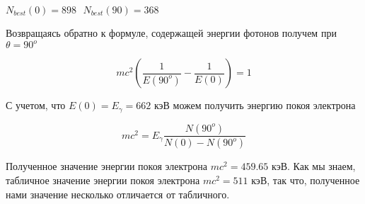     \begin{center}
        $N_{best}(0) = 898 ~~~ N_{best}(90) =368$
    \end{center}

    Возвращаясь обратно к формуле, содержащей энергии фотонов получем при $\theta = 90^o$

    \begin{equation}
        mc^2 \left (\frac{1}{E(90^o)} - \frac{1}{E(0)} \right) = 1
    \end{equation}

    С учетом, что $E(0) = E_{\gamma} = 662$ кэВ можем получить энергию покоя электрона

    \begin{equation}
        mc^2 = E_{\gamma} \frac{N(90^o)}{N(0) - N(90^o)}
    \end{equation}

    Полученное значение энергии покоя электрона $mc^2 = 459.65$ кэВ. Как мы знаем, табличное значение
    энергии покоя электрона $mc^2 = 511$ кэВ, так что, полученное нами значение несколько отличается от табличного.

